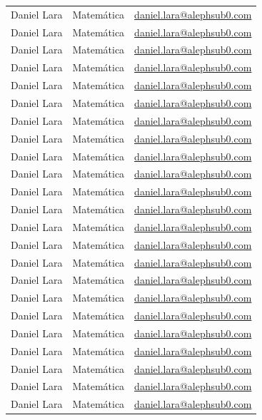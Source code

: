 \documentclass[a4,10pt]{aleph-notas}
\begin{document}
\begin{center}
\begin{longtable}{lll}
  Daniel Lara      &	Matemática	& \url{daniel.lara@alephsub0.com}  \\
  Daniel Lara      &	Matemática	& \url{daniel.lara@alephsub0.com}  \\
  Daniel Lara      &	Matemática	& \url{daniel.lara@alephsub0.com}  \\
  Daniel Lara      &	Matemática	& \url{daniel.lara@alephsub0.com}  \\
  Daniel Lara      &	Matemática	& \url{daniel.lara@alephsub0.com}  \\
  Daniel Lara      &	Matemática	& \url{daniel.lara@alephsub0.com}  \\
  Daniel Lara      &	Matemática	& \url{daniel.lara@alephsub0.com}  \\
  Daniel Lara      &	Matemática	& \url{daniel.lara@alephsub0.com}  \\
  Daniel Lara      &	Matemática	& \url{daniel.lara@alephsub0.com}  \\
  Daniel Lara      &	Matemática	& \url{daniel.lara@alephsub0.com}  \\
  Daniel Lara      &	Matemática	& \url{daniel.lara@alephsub0.com}  \\
  Daniel Lara      &	Matemática	& \url{daniel.lara@alephsub0.com}  \\
  Daniel Lara      &	Matemática	& \url{daniel.lara@alephsub0.com}  \\
  Daniel Lara      &	Matemática	& \url{daniel.lara@alephsub0.com}  \\
  Daniel Lara      &	Matemática	& \url{daniel.lara@alephsub0.com}  \\
  Daniel Lara      &	Matemática	& \url{daniel.lara@alephsub0.com}  \\
  Daniel Lara      &	Matemática	& \url{daniel.lara@alephsub0.com}  \\
  Daniel Lara      &	Matemática	& \url{daniel.lara@alephsub0.com}  \\
  Daniel Lara      &	Matemática	& \url{daniel.lara@alephsub0.com}  \\
  Daniel Lara      &	Matemática	& \url{daniel.lara@alephsub0.com}  \\
  Daniel Lara      &	Matemática	& \url{daniel.lara@alephsub0.com}  \\
  Daniel Lara      &	Matemática	& \url{daniel.lara@alephsub0.com}  \\
  Daniel Lara      &	Matemática	& \url{daniel.lara@alephsub0.com}  \\
 \end{longtable}
 \end{center}
\end{document}
